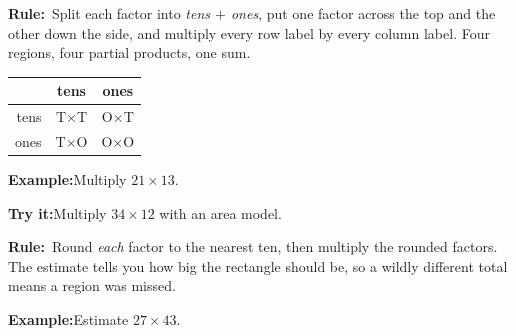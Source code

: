 \documentclass[12pt]{article}
\begin{document}


\begin{formulabox}\textbf{Rule:}\ Split each factor into \emph{tens $+$ ones},
put one factor across the top and the other down the side, and multiply every
row label by every column label. Four regions, four partial products, one sum.
\begin{center}
\begin{tabular}{|r|c|c|}
\hline
& tens & ones \\ \hline
tens & T$\times$T & O$\times$T\\ \hline
ones & T$\times$O & O$\times$O\\ \hline
\end{tabular}
\end{center}
\end{formulabox}

\begin{examplebox}\textbf{Example:}\quad Multiply $21 \times 13$.
\end{examplebox}

\begin{tryitbox}\textbf{Try it:}\quad Multiply $34 \times 12$ with an area model.
\ \end{tryitbox}


\begin{formulabox}\textbf{Rule:}\ Round \emph{each} factor to the nearest ten,
then multiply the rounded factors. The estimate tells you how big the rectangle
should be, so a wildly different total means a region was missed.
\end{formulabox}

\begin{examplebox}\textbf{Example:}\quad Estimate $27 \times 43$.
\end{examplebox}
\end{document}
